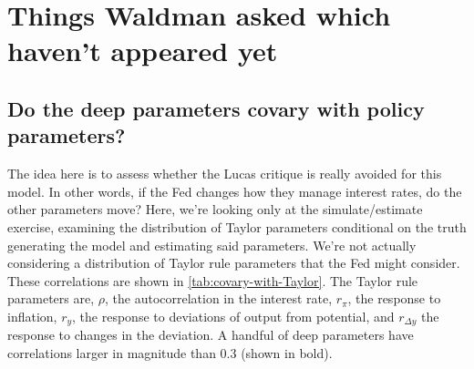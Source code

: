 \documentclass[11pt]{article}
\begin{document}
\hypertarget{things-waldman-asked-which-havent-appeared-yet}{%
\section{Things Waldman asked which haven't appeared
yet}\label{things-waldman-asked-which-havent-appeared-yet}}

\hypertarget{do-the-deep-parameters-covary-with-policy-parameters}{%
\subsection{Do the deep parameters covary with policy
parameters?}\label{do-the-deep-parameters-covary-with-policy-parameters}}

The idea here is to assess whether the Lucas critique is really avoided
for this model. In other words, if the Fed changes how they manage
interest rates, do the other parameters move? Here, we're looking only
at the simulate/estimate exercise, examining the distribution of Taylor
parameters conditional on the truth generating the model and estimating
said parameters. We're not actually considering a distribution of Taylor
rule parameters that the Fed might consider. These correlations are
shown in \autoref{tab:covary-with-Taylor}. The Taylor rule parameters
are, \(\rho\), the autocorrelation in the interest rate, \(r_\pi\), the
response to inflation, \(r_y\), the response to deviations of output
from potential, and \(r_{\Delta y}\) the response to changes in the
deviation. A handful of deep parameters have correlations larger in
magnitude than 0.3 (shown in bold).
\end{document}
